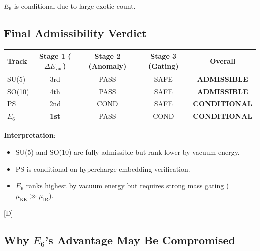 \documentclass[11pt,a4paper]{article}
\newcommand{\tagD}{\textcolor{blue!70!black}{[D]}}
\begin{document}
$E_6$ is conditional due to large exotic count.

\subsection{Final Admissibility Verdict}

\begin{resultbox}
\begin{center}
\begin{tabular}{lcccc}
\toprule
Track & Stage 1 ($\Delta E_{\text{vac}}$) & Stage 2 (Anomaly) & Stage 3 (Gating) & \textbf{Overall} \\
\midrule
SU(5) & 3rd & PASS & SAFE & \textcolor{green!60!black}{\textbf{ADMISSIBLE}} \\
SO(10) & 4th & PASS & SAFE & \textcolor{green!60!black}{\textbf{ADMISSIBLE}} \\
PS & 2nd & COND & SAFE & \textcolor{orange!70!black}{\textbf{CONDITIONAL}} \\
$E_6$ & \textbf{1st} & PASS & COND & \textcolor{orange!70!black}{\textbf{CONDITIONAL}} \\
\bottomrule
\end{tabular}
\end{center}

\textbf{Interpretation}:
\begin{itemize}
    \item SU(5) and SO(10) are fully admissible but rank lower by vacuum energy.
    \item PS is conditional on hypercharge embedding verification.
    \item $E_6$ ranks highest by vacuum energy but requires strong mass gating ($\mu_{\text{KK}} \gg \mu_{\text{IR}}$).
\end{itemize}
\tagD
\end{resultbox}

\subsection{Why $E_6$'s Advantage May Be Compromised}
\end{document}
